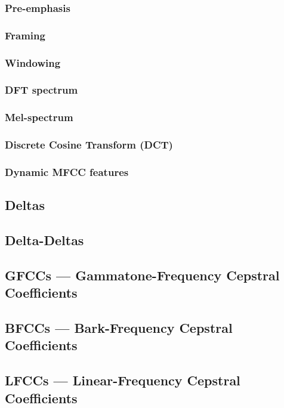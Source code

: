 \subsubsection{Pre-emphasis}
\subsubsection{Framing}
\subsubsection{Windowing}
\subsubsection{DFT spectrum}
\subsubsection{Mel-spectrum}
\subsubsection{Discrete Cosine Transform (DCT)}
\subsubsection{Dynamic MFCC features}


\subsection{Deltas}
\subsection{Delta-Deltas}

\subsection{GFCCs --- Gammatone-Frequency Cepstral Coefficients}
\subsection{BFCCs --- Bark-Frequency Cepstral Coefficients}
\subsection{LFCCs --- Linear-Frequency Cepstral Coefficients}
